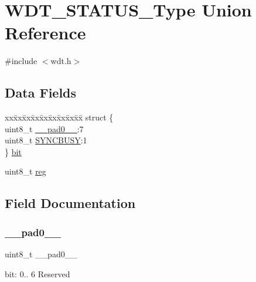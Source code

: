 \hypertarget{union_w_d_t___s_t_a_t_u_s___type}{}\section{W\+D\+T\+\_\+\+S\+T\+A\+T\+U\+S\+\_\+\+Type Union Reference}
\label{union_w_d_t___s_t_a_t_u_s___type}


{\ttfamily \#include $<$wdt.\+h$>$}

\subsection*{Data Fields}
\begin{DoxyCompactItemize}
\item 
\begin{tabbing}
xx\=xx\=xx\=xx\=xx\=xx\=xx\=xx\=xx\=\kill
struct \{\\
\>uint8\_t \mbox{\hyperlink{union_w_d_t___s_t_a_t_u_s___type_a8b4eebe79ded0459acec2f4950102ba3}{\_\_pad0\_\_}}:7\\
\>uint8\_t \mbox{\hyperlink{union_w_d_t___s_t_a_t_u_s___type_abb30254758e23bd24824e436a1aa8716}{SYNCBUSY}}:1\\
\} \mbox{\hyperlink{union_w_d_t___s_t_a_t_u_s___type_a758ae325ffabc22bf3136e1de3fd0d4d}{bit}}\\

\end{tabbing}\item 
uint8\+\_\+t \mbox{\hyperlink{union_w_d_t___s_t_a_t_u_s___type_a9428adc9af4653a2050e2536b55dec8d}{reg}}
\end{DoxyCompactItemize}


\subsection{Field Documentation}
\mbox{\label{union_w_d_t___s_t_a_t_u_s___type_a8b4eebe79ded0459acec2f4950102ba3}} 
\subsubsection{\texorpdfstring{\_\_pad0\_\_}{\_\_pad0\_\_}}
{\footnotesize\ttfamily uint8\+\_\+t \+\_\+\+\_\+pad0\+\_\+\+\_\+}

bit\+: 0.. 6 Reserved \mbox{\label{union_w_d_t___s_t_a_t_u_s___type_a758ae325ffabc22bf3136e1de3fd0d4d}} 
